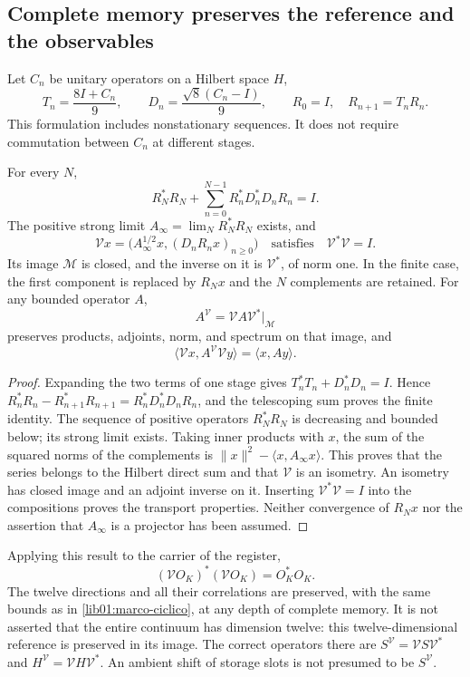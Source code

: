\subsection{Complete memory preserves the reference and the observables}
\label{lib01:memoria-completa}

Let \(C_n\) be unitary operators on a Hilbert space \(H\),
\[
 T_n=\frac{8I+C_n}{9},\qquad
 D_n=\frac{\sqrt8(C_n-I)}9,\qquad
 R_0=I,\quad R_{n+1}=T_nR_n.
\]
This formulation includes nonstationary sequences. It does not require commutation between \(C_n\) at different stages.

\begin{theorem}
\label{lib01:isometria}
For every \(N\),
\[
 R_N^*R_N+\sum_{n=0}^{N-1}R_n^*D_n^*D_nR_n=I.
\]
The positive strong limit \(A_\infty=\lim_N R_N^*R_N\) exists, and
\begin{equation}
 \mathcal Vx=
 \bigl(A_\infty^{1/2}x,(D_nR_nx)_{n\geq0}\bigr)
 \quad\text{satisfies}\quad\mathcal V^*\mathcal V=I.
 \label{lib01:V-infinita}
\end{equation}
Its image \(\mathcal M\) is closed, and the inverse on it is \(\mathcal V^*\), of norm one. In the finite case, the first component is replaced by \(R_Nx\) and the \(N\) complements are retained. For any bounded operator \(A\),
\[
 A^{\mathcal V}=\mathcal VA\mathcal V^*\big|_{\mathcal M}
\]
preserves products, adjoints, norm, and spectrum on that image, and
\[
 \langle\mathcal Vx,A^{\mathcal V}\mathcal Vy\rangle
 =\langle x,Ay\rangle.
\]
\end{theorem}
\begin{proof}
Expanding the two terms of one stage gives \(T_n^*T_n+D_n^*D_n=I\). Hence \(R_n^*R_n-R_{n+1}^*R_{n+1}=R_n^*D_n^*D_nR_n\), and the telescoping sum proves the finite identity. The sequence of positive operators \(R_N^*R_N\) is decreasing and bounded below; its strong limit exists. Taking inner products with \(x\), the sum of the squared norms of the complements is \(\|x\|^2-\langle x,A_\infty x\rangle\). This proves that the series belongs to the Hilbert direct sum and that \(\mathcal V\) is an isometry. An isometry has closed image and an adjoint inverse on it. Inserting \(\mathcal V^*\mathcal V=I\) into the compositions proves the transport properties. Neither convergence of \(R_Nx\) nor the assertion that \(A_\infty\) is a projector has been assumed.
\end{proof}

Applying this result to the carrier of the register,
\begin{equation}
 (\mathcal VO_K)^*(\mathcal VO_K)=O_K^*O_K.
 \label{lib01:gram-memoria}
\end{equation}
The twelve directions and all their correlations are preserved, with the same bounds as in \cref{lib01:marco-ciclico}, at any depth of complete memory. It is not asserted that the entire continuum has dimension twelve: this twelve-dimensional reference is preserved in its image. The correct operators there are \(S^{\mathcal V}=\mathcal VS\mathcal V^*\) and \(H^{\mathcal V}=\mathcal VH\mathcal V^*\). An ambient shift of storage slots is not presumed to be \(S^{\mathcal V}\).

